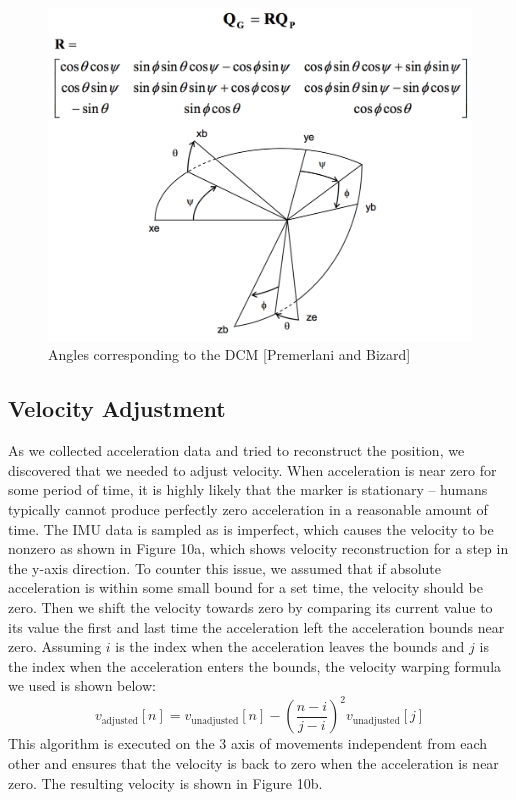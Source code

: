 \documentclass[12pt,journal]{IEEEtran}
\begin{document}
\begin{figure}[h]
    \includegraphics[width=\linewidth]{figures/dcm}
  \caption{Angles corresponding to the DCM [Premerlani and Bizard]}
  \label{fig:vel-adjust}
\end{figure}

\subsection{Velocity Adjustment}
	As we collected acceleration data and tried to reconstruct the position, we discovered that we needed to adjust velocity. When acceleration is near zero for some period of time, it is highly likely that the marker is stationary -- humans typically cannot produce perfectly zero acceleration in a reasonable amount of time. The IMU data is sampled as is imperfect, which causes the velocity to be nonzero as shown in Figure 10a, which shows velocity reconstruction for a step in the y-axis direction.
	To counter this issue, we assumed that if absolute acceleration is within some small bound for a set time, the velocity should be zero. Then we shift the velocity towards zero by comparing its current value to its value the first and last time the acceleration left the acceleration bounds near zero. Assuming $i$ is the index when the acceleration leaves the bounds and $j$ is the index when the acceleration enters the bounds, the velocity warping formula we used is shown below:
$$v_{\text{adjusted}}[n] = v_{\text{unadjusted}}[n] - \left(\frac{n-i}{j-i}\right)^2 v_{\text{unadjusted}}[j]$$
This algorithm is executed on the 3 axis of movements independent from each other and ensures that the velocity is back to zero when the acceleration is near zero. The resulting velocity is shown in Figure 10b.
\end{document}
